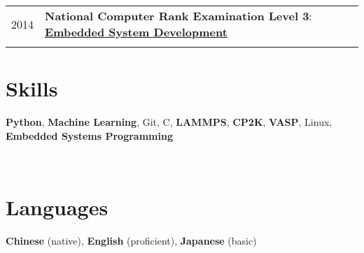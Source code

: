 \documentclass[a4paper,10pt]{article} %
\begin{document}
\begin{tabular}{r|l}
2014					& \textbf{National Computer Rank Examination Level 3}: \href{https://nbviewer.org/github/HuangJiaLian/DataBase0/blob/bffb5248aa974d5a5a0b1b5c9130951158f4f460/uPic/2021_11_26_11_6.png}{\textbf{Embedded System Development}}\\
\multicolumn{2}{c}{} \\	%

\end{tabular}

\section{Skills}
\begin{small}
\textbf{Python}, \textbf{Machine Learning},  Git, C, \textbf{LAMMPS}, \textbf{CP2K}, \textbf{VASP}, Linux,  \textbf{Embedded Systems Programming}
\end{small}
\\

\section{Languages}
\textbf{Chinese} (native),  \textbf{English} (proficient),  \textbf{Japanese} (basic)
\\
\end{document}
